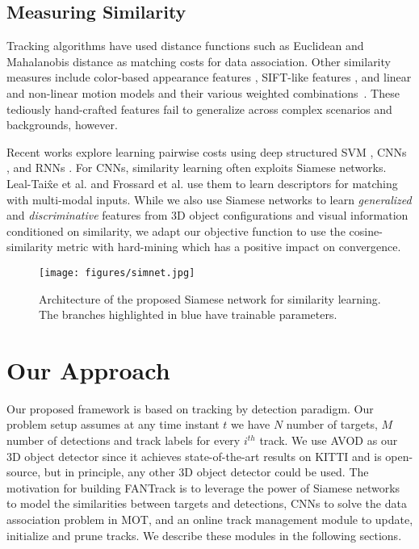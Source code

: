 \documentclass[letterpaper, 10 pt, conference]{ieeeconf}
\begin{document}
\subsection{Measuring Similarity}
Tracking algorithms have used distance functions such as Euclidean \cite{euclidean} and Mahalanobis distance \cite{mahalanobis} as matching costs for data association. Other similarity measures include color-based appearance features \cite{app2}, SIFT-like features \cite{sift}, and linear and non-linear motion models and their various weighted combinations~\cite{afld}. These tediously hand-crafted features fail to generalize across complex scenarios and backgrounds, however.
\par Recent works explore learning pairwise costs using deep structured SVM \cite{netflow}, CNNs \cite{quadcnn}, and RNNs \cite{amir}. For CNNs, similarity learning often exploits Siamese networks. Leal-Tai\^xe et al. \cite{leal-taixe} and Frossard et al. \cite{frossard} use them to learn descriptors for matching with multi-modal inputs. While we also use Siamese networks to learn \textit{generalized} and \textit{discriminative} features from 3D object configurations and visual information conditioned on similarity, we adapt our objective function to use the cosine-similarity metric with hard-mining which has a positive impact on convergence. 

\begin{figure*}[t]
\vspace{1.5em}
\begin{center}
\texttt{[image: figures/simnet.jpg]}
\end{center}
\caption{Architecture of the proposed Siamese network for similarity learning. The branches highlighted in blue have trainable parameters.}
\label{fig_simNet}
\vspace{-1.5em}
\end{figure*}






\section{Our Approach}
Our proposed framework is based on tracking by detection paradigm. Our problem setup assumes at any time instant $t$ we have $N$ number of targets, $M$ number of detections and track labels for every $i^{th}$ track. We use AVOD \cite{AVOD} as our 3D object detector since it achieves state-of-the-art results on KITTI and is open-source, but in principle, any other 3D object detector could be used. The motivation for building FANTrack is to leverage the power of Siamese networks to model the similarities between targets and detections, CNNs to solve the data association problem in MOT, and an online track management module to update, initialize and prune tracks. We describe these modules in the following sections. 
\end{document}
